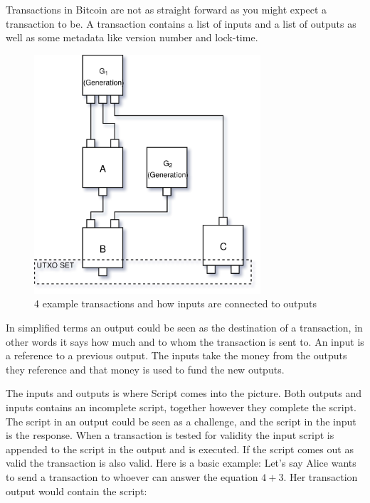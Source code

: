 \label{transactions}
Transactions in Bitcoin are not as straight forward as you might expect a transaction to be. A transaction contains a list of inputs and a list of outputs as well as some metadata like version number and lock-time.\cite{bitcoin_core_tx}\cite{antonopoulos_2017}

\begin{figure}[H]
	\centering
	\includegraphics[width=0.75\textwidth]{background/images/transaction_diagram.png}
	\caption{4 example transactions and how inputs are connected to outputs}
	\label{fig:transaction_input_output}
\end{figure}

In simplified terms an output could be seen as the destination of a transaction, in other words it says how much and to whom the transaction is sent to. An input is a reference to a previous output. The inputs take the money from the outputs they reference and that money is used to fund the new outputs.\cite{antonopoulos_2017}\cite{bitcoin_core_tx}

The inputs and outputs is where Script comes into the picture. Both outputs and inputs contains an incomplete script, together however they complete the script. The script in an output could be seen as a challenge, and the script in the input is the response. When a transaction is tested for validity the input script is appended to the script in the output and is executed. If the script comes out as valid the transaction is also valid.\cite{antonopoulos_2017}\cite{bitcoin_core_tx} Here is a basic example: Let's say Alice wants to send a transaction to whoever can answer the equation $4+3$. Her transaction output would contain the script:

